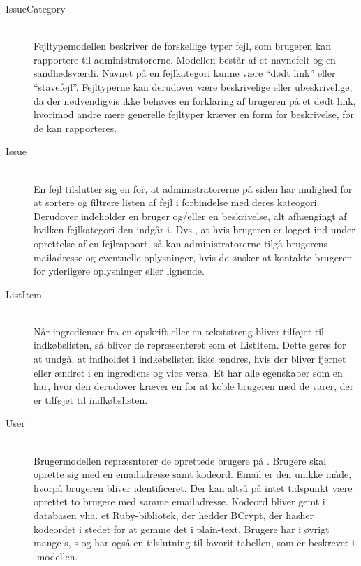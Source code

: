 \begin{description}
  \item[IssueCategory] \hfill \\
    Fejltypemodellen beskriver de forskellige typer fejl, som brugeren kan rapportere til administratorerne. Modellen består af et navnefelt og en sandhedsværdi. Navnet på en fejlkategori kunne \fx være ``dødt link'' eller ``stavefejl''. Fejltyperne kan derudover være beskrivelige eller ubeskrivelige, da der nødvendigvis ikke behøves en forklaring af brugeren på \fx et dødt link, hvorimod andre mere generelle fejltyper kræver en form for beskrivelse, før de kan rapporteres.

  \item[Issue] \hfill \\
    En fejl tilslutter sig en  for, at administratorerne på siden har mulighed for at sortere og filtrere listen af fejl i forbindelse med deres kateogori. Derudover indeholder  en bruger og/eller en beskrivelse, alt afhængingt af hvilken fejlkategori den indgår i. Dvs., at hvis brugeren er logget ind under oprettelse af en fejlrapport, så kan administratorerne tilgå brugerens mailadresse og eventuelle oplysninger, hvis de ønsker at kontakte brugeren for yderligere oplysninger eller lignende.

  \item[ListItem] \hfill \\
    Når ingredienser fra en opskrift eller en tekststreng bliver tilføjet til indkøbslisten, så bliver de repræsenteret som et ListItem. Dette gøres for at undgå, at indholdet i indkøbslisten ikke ændres, hvis der bliver fjernet eller ændret i en ingrediens  og vice versa. Et  har alle egenskaber som en  har, hvor den derudover kræver en  for at koble brugeren med de varer, der er tilføjet til indkøbslisten.

  \item[User] \hfill \\
    Brugermodellen repræsnterer de oprettede brugere på \Foodl{}. Brugere skal oprette sig med en emailadresse samt kodeord. Email er den unikke måde, hvorpå brugeren bliver identificeret. Der kan altså på intet tidspunkt være oprettet to brugere med samme emailadresse. Kodeord bliver gemt i databasen vha. et Ruby-bibliotek, der hedder BCrypt, der hasher kodeordet i stedet for at gemme det i plain-text. Brugere har i øvrigt mange s, s og har også en tilslutning til favorit-tabellen, som er beskrevet i -modellen.

\end{description}

